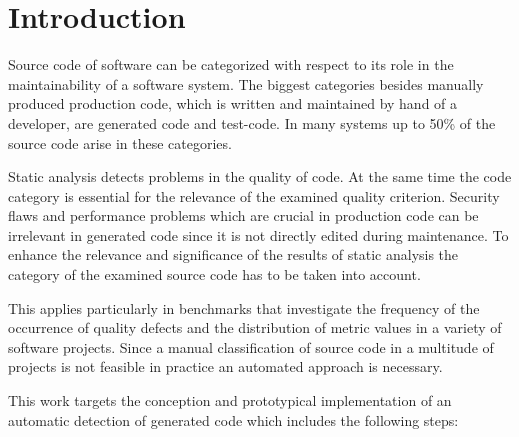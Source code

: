 
\chapter{Introduction}\label{chapter:introduction}

Source code of software can be categorized with respect to its role in the maintainability of a software system. The biggest categories besides manually produced production code, which is written and maintained by hand of a developer, are generated code and test-code. In many systems up to 50\% of the source code arise in these categories.

Static analysis detects problems in the quality of code. At the same time the code category is essential for the relevance of the examined quality criterion. Security flaws and performance problems which are crucial in production code can be irrelevant in generated code since it is not directly edited during maintenance. To enhance the relevance and significance of the results of static analysis the category of the examined source code has to be taken into account.

This applies particularly in benchmarks that investigate the frequency of the occurrence of quality defects and the distribution of metric values in a variety of software projects. Since a manual classification of source code in a multitude of projects is not feasible in practice an automated approach is necessary.

This work targets the conception and prototypical implementation of an automatic detection of generated code which includes the following steps:

